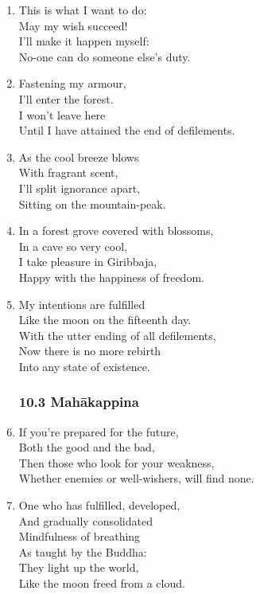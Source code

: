 \documentclass[10pt, openany]{book}
\begin{document}
\begin{enumerate}
\item This is what I want to do:\\
May my wish succeed!\\
I’ll make it happen myself:\\
No-one can do someone else’s duty.

\item Fastening my armour,\\
I’ll enter the forest.\\
I won’t leave here\\
Until I have attained the end of defilements.

\item As the cool breeze blows\\
With fragrant scent,\\
I’ll split ignorance apart,\\
Sitting on the mountain-peak.

\item In a forest grove covered with blossoms,\\
In a cave so very cool,\\
I take pleasure in Giribbaja,\\
Happy with the happiness of freedom.

\item My intentions are fulfilled\\
Like the moon on the fifteenth day.\\
With the utter ending of all defilements,\\
Now there is no more rebirth \\
Into any state of existence.

\subsubsection*{10.3 Mahākappina}

\item If you’re prepared for the future,\\
Both the good and the bad,\\
Then those who look for your weakness,\\
Whether enemies or well-wishers, will find none.

\item One who has fulfilled, developed,\\
And gradually consolidated\\
Mindfulness of breathing\\
As taught by the Buddha:\\
They light up the world,\\
Like the moon freed from a cloud.


\end{enumerate}
\end{document}
